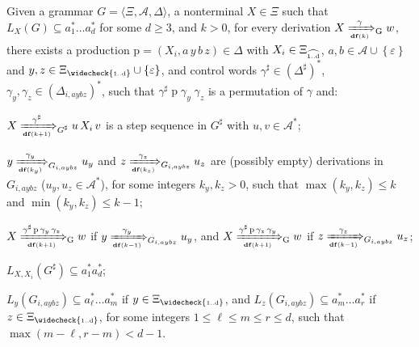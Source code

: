 \documentclass[final]{llncs}
\def\set#1{{\left\{ #1 \right\}}}
\def\tuple#1{{\langle #1 \rangle}}
\def\prod{\Delta}
\def\df#1{\scriptscriptstyle\mathbf{df}(#1)}
\def\Vars{\ensuremath{\Xi}}
\def\Varsi{\ensuremath{\Xi_{\widecheck{\text{\tiny 1..d}}}}}
\def\Varse{\ensuremath{\Xi_{\widehat{\text{\tiny 1..d}}}}}
\begin{document}
\begin{lemma}\label{lem:ginsbook-surgery}
  Given a grammar $G =\tuple{\Vars,\mathcal{A},\prod}$, a nonterminal
  $X\in\Vars$ such that \(L_X(G) \subseteq a_1^* \ldots a_d^*\) for
  some \(d \geq 3\), and \(k>0\), for every derivation
  $X \xRightarrow[\df{k}]{\gamma}_{\raisebox{1.5ex}{{\scriptsize G}}}
  w$, there exists a production $\mathrm{p}=(X_i, a\,y\,b\,z) \in \prod$ with
  $X_i \in \Varse$, $a,b \in \mathcal{A}\cup\set{\varepsilon}$ and
  $y,z \in \Varsi \cup \set{\varepsilon}$, and
  control words $\gamma^\sharp \in (\Delta^\sharp)^*$,
  $\gamma_{y},\gamma_{z} \in (\Delta_{i,aybz})^*$, such
  that \(\gamma^\sharp \; \mathrm{p}\; \gamma_y \; \gamma_z\) is a
  permutation of \(\gamma\)
  and: \begin{compactenum} 
  
  \item\label{item1:ginsbook-surgery} \(X \xRightarrow[\df{k+1}]{\gamma^\sharp}_{\raisebox{1.5ex}{{\scriptsize
  $G^{\sharp}$}}} u\, X_i\, v\) is a step sequence in \(G^\sharp\)
  with \(u, v\in \mathcal{A}^*\);

  \item\label{item2:ginsbook-surgery} \(y
		\xRightarrow[\df{k_y}]{\gamma_{y}}_{\raisebox{1.5ex}{{\scriptsize $G_{i,aybz}$}}} u_y\) and \(z
		\xRightarrow[\df{k_z}]{\gamma_{z}}_{\raisebox{1.5ex}{{\scriptsize $G_{i,aybz}$}}} u_z\) are (possibly empty) derivations 
                in \(G_{i,aybz}\) (\(u_y, u_z \in \mathcal{A}^* \)), for some integers \(k_y,k_z>0\), 
                such that \(\max(k_y,k_z)\leq k\) and \(\min(k_y,k_z)\leq k-1\);

  \item\label{item3:ginsbook-surgery} 
  \(X \xRightarrow[\df{k+1}]{\gamma^\sharp \,
	\mathrm{p} \, \gamma_y \, \gamma_z}_{\raisebox{1.5ex}{{\scriptsize G}}} w\)
	if \(y \xRightarrow[\df{k-1}]{\gamma_y}_{\raisebox{1.5ex}{{\scriptsize $G_{i,aybz}$}}} u_y\), and
    \(X \xRightarrow[\df{k+1}]{\gamma^\sharp \,
    \mathrm{p} \, \gamma_z \, \gamma_y}_{\raisebox{1.5ex}{{\scriptsize G}}} w\)
		if \(z \xRightarrow[\df{k-1}]{\gamma_z}_{\raisebox{1.5ex}{{\scriptsize $G_{i,aybz}$}}} u_z\);        

  \item\label{item4:ginsbook-surgery} \(L_{X,X_i}(G^\sharp) \subseteq
    a_1^* a_d^* \);
  \item\label{item5:ginsbook-surgery} \(L_{y}(G_{i,aybz}) \subseteq
    a_{\ell}^* \ldots a_{m}^*\) if \(y \in \Varsi\), and \(L_{z}(G_{i,aybz})
    \subseteq a_{m}^* \ldots a_{r}^*\) if \(z \in \Varsi\), for some integers
    \(1\leq \ell \leq m \leq r \leq d\), such that \( \max(m-\ell,r-m) < d - 1\).
  \end{compactenum}
\end{lemma}
\end{document}
